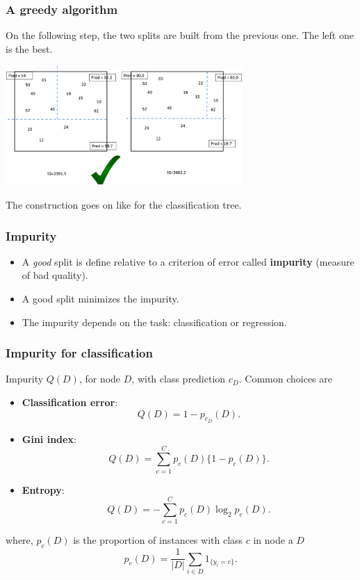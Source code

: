 \begin{frame}
\frametitle{A greedy algorithm}
On the following step, the two splits are built from the previous one. The left one is the best. 
\begin{center}
\includegraphics[width=9cm]{../../Graphs/RT_Build2.png}
\end{center}
The construction goes on like for the classification tree.  
\end{frame}
\begin{frame}
\frametitle{Impurity}
\begin{itemize}
\item A {\it good} split is define relative to a criterion of error called {\bf impurity} (measure of bad quality). 
\item A good split minimizes the impurity.
\item The impurity depends on the task: classification or regression.
\end{itemize}
\end{frame}
\begin{frame}
\frametitle{Impurity for classification}
Impurity $Q(D)$, for node $D$, with class prediction $c_D$. Common choices are
\begin{itemize}
\item {\bf Classification error}: 
$$
Q(D)=1-p_{c_D}(D).
$$
\item {\bf Gini index}:
$$
Q(D) = \sum_{c=1}^C p_c(D)\{1-p_c(D)\}.
$$
\item {\bf Entropy}:
$$
Q(D) = -\sum_{c=1}^C p_c(D)\log_2 p_c(D).
$$
\end{itemize}
\vspace{0.2cm} 
where, $p_c(D)$ is the proportion of instances with class $c$ in node a $D$
$$
p_c(D) = \frac{1}{|D|}\sum_{i\in D} 1_{\{y_i = c\}}.
$$
\end{frame}
